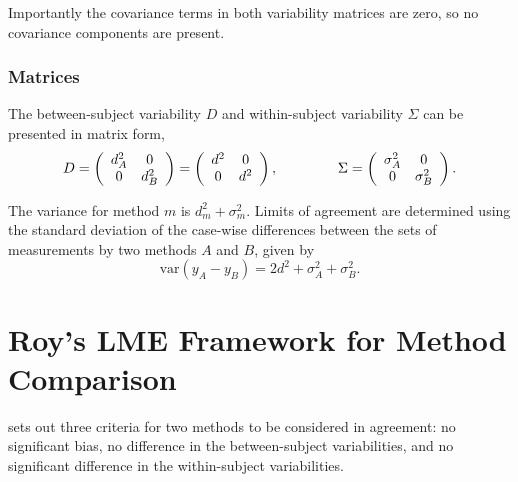 \documentclass[12pt, a4paper]{report}
\theoremstyle{plain}
\theoremstyle{definition}
\theoremstyle{remark}
\begin{document}
Importantly the covariance terms in both variability matrices are zero, so no covariance components are present.



\subsubsection*{Matrices}
The between-subject variability ${D}$ and within-subject variability ${\Sigma}$ can be presented in matrix form,\[
{D} = \left(%
\begin{array}{cc}
d^2_{A}& 0 \\
0 & d^2_{B} \\
\end{array}%
\right)=\left(%
\begin{array}{cc}
d^2& 0 \\
0 & d^2\\
\end{array}%
\right),
\hspace{1.5cm}
{\Sigma} = \left(%
\begin{array}{cc}
\sigma^2_{A}& 0 \\
0 & \sigma^2_{B} \\
\end{array}%
\right).
\]

The variance for method $m$ is $d^2_{m}+\sigma^2_{m}$. Limits of agreement are determined using the standard deviation of the case-wise differences between the sets of measurements by two methods $A$ and $B$, given by
\begin{equation}
\mbox{var} (y_{A}-y_{B}) = 2d^2 + \sigma^2_{A}+ \sigma^2_{B}.
\end{equation}






\section{Roy's LME Framework for Method Comparison }
\citet{Barnhart} sets out three criteria for two methods to be considered in agreement: no significant bias, no difference in the between-subject variabilities, and no significant difference in the within-subject variabilities.
\end{document}
